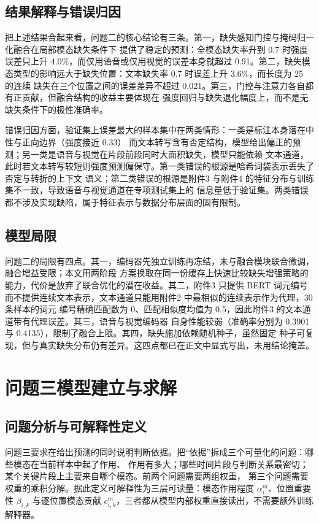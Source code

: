 \documentclass[bwprint]{gmcmthesis}
\begin{document}
\subsection{结果解释与错误归因}

把上述结果合起来看，问题二的核心结论有三条。第一，缺失感知门控与掩码归一化融合在局部模态缺失条件下
提供了稳定的预测：全模态缺失率升到 0.7 时强度误差只上升 4.0\%，而仅用语音或仅用视觉的误差本身就超过
0.91。第二，缺失模态类型的影响远大于缺失位置：文本缺失率 0.7 时误差上升 3.6\%，而长度为 25 的连续
缺失在三个位置之间的误差差异不超过 0.021。第三，门控与注意力各自都有正贡献，但融合结构的收益主要体现在
强度回归与缺失退化幅度上，而不是无缺失条件下的极性准确率。

错误归因方面，验证集上误差最大的样本集中在两类情形：一类是标注本身落在中性与正向边界（强度接近 0.33）
而文本转写含有否定结构，模型给出偏正的预测；另一类是语音与视觉在片段前段同时大面积缺失，模型只能依赖
文本通道，此时若文本转写较短则强度预测偏保守。第一类错误的根源是哈希词袋表示丢失了否定与转折的上下文
语义；第二类错误的根源是附件3 与附件4 的特征分布与训练集不一致，导致语音与视觉通道在专项测试集上的
信息量低于验证集。两类错误都不涉及实现缺陷，属于特征表示与数据分布层面的固有限制。

\subsection{模型局限}

问题二的局限有四点。其一，编码器先独立训练再冻结，未与融合模块联合微调，融合增益受限；本文用两阶段
方案换取在同一份缓存上快速比较缺失增强策略的能力，代价是放弃了联合优化的潜在收益。其二，附件3 只提供
BERT 词元编号而不提供连续文本表示，文本通道只能用附件2 中最相似的连续表示作为代理，30 条样本的词元
编号精确匹配数为 0、匹配相似度均值为 0.5，因此附件3 的文本通道带有代理误差。其三，语音与视觉编码器
自身性能较弱（准确率分别为 0.3901 与 0.4135），限制了融合上限。其四，缺失施加依赖随机种子，虽然固定
种子可复现，但与真实缺失分布仍有差异。这四点都已在正文中显式写出，未用结论掩盖。

\section{问题三模型建立与求解}

\subsection{问题分析与可解释性定义}

问题三要求在给出预测的同时说明判断依据。把“依据”拆成三个可量化的问题：哪些模态在当前样本中起了作用、
作用有多大；哪些时间片段与判断关系最密切；某个关键片段上主要来自哪个模态。前两个问题需要两组权重，
第三个问题需要权重的乘积分解。据此定义可解释性为三层可读量：模态作用程度 $\alpha^{m}_i$、位置重要性
$\beta_{i,k}$ 与逐位置模态贡献 $c^{m}_{i,k}$，三者都从模型内部权重直接读出，不需要额外训练解释器。
\end{document}
